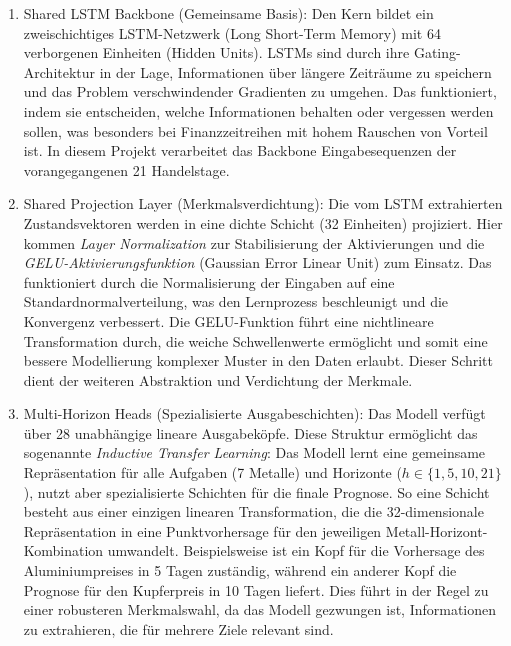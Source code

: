 \begin{enumerate}
    \item Shared LSTM Backbone (Gemeinsame Basis): Den Kern bildet ein zweischichtiges LSTM-Netzwerk (Long Short-Term Memory) mit 64 verborgenen Einheiten (Hidden Units). LSTMs sind durch ihre Gating-Architektur in der Lage, Informationen über längere Zeiträume zu speichern und das Problem verschwindender Gradienten zu umgehen. Das funktioniert, indem sie entscheiden, welche Informationen behalten oder vergessen werden sollen, was besonders bei Finanzzeitreihen mit hohem Rauschen von Vorteil ist. In diesem Projekt verarbeitet das Backbone Eingabesequenzen der vorangegangenen 21 Handelstage.
    \item Shared Projection Layer (Merkmalsverdichtung): Die vom LSTM extrahierten Zustandsvektoren werden in eine dichte Schicht (32 Einheiten) projiziert. Hier kommen \emph{Layer Normalization} zur Stabilisierung der Aktivierungen und die \emph{GELU-Aktivierungsfunktion} (Gaussian Error Linear Unit) zum Einsatz.  Das funktioniert durch die Normalisierung der Eingaben auf eine Standardnormalverteilung, was den Lernprozess beschleunigt und die Konvergenz verbessert. Die GELU-Funktion führt eine nichtlineare Transformation durch, die weiche Schwellenwerte ermöglicht und somit eine bessere Modellierung komplexer Muster in den Daten erlaubt. Dieser Schritt dient der weiteren Abstraktion und Verdichtung der Merkmale.
    \item Multi-Horizon Heads (Spezialisierte Ausgabeschichten): Das Modell verfügt über 28 unabhängige lineare Ausgabeköpfe. Diese Struktur ermöglicht das sogenannte \emph{Inductive Transfer Learning}: Das Modell lernt eine gemeinsame Repräsentation für alle Aufgaben (7 Metalle) und Horizonte ($h \in \{1, 5, 10, 21\}$), nutzt aber spezialisierte Schichten für die finale Prognose. So eine Schicht besteht aus einer einzigen linearen Transformation, die die 32-dimensionale Repräsentation in eine Punktvorhersage für den jeweiligen Metall-Horizont-Kombination umwandelt. Beispielsweise ist ein Kopf für die Vorhersage des Aluminiumpreises in 5 Tagen zuständig, während ein anderer Kopf die Prognose für den Kupferpreis in 10 Tagen liefert. Dies führt in der Regel zu einer robusteren Merkmalswahl, da das Modell gezwungen ist, Informationen zu extrahieren, die für mehrere Ziele relevant sind.
\end{enumerate}

